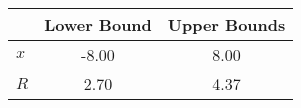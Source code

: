 \begin{tiny}\begin{tabular}{|l|c|c|}
\hline
&\textbf{Lower Bound}&\textbf{Upper Bounds}\\\hline
\textbf{$x$}&-8.00&8.00\\\hline
\textbf{$R$}&2.70&4.37\\\hline
\end{tabular}
\end{tiny}